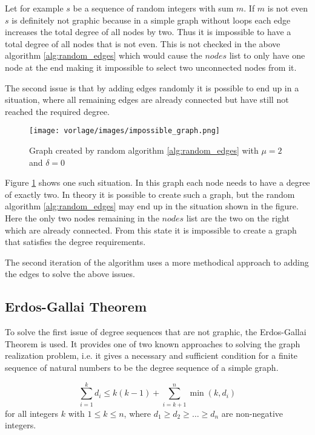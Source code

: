 Let for example $s$ be a sequence of random integers with sum $m$. If $m$ is not even $s$ is definitely not graphic because in a simple graph without loops each edge increases the total degree of all nodes by two. Thus it is impossible to have a total degree of all nodes that is not even. This is not checked in the above algorithm \ref{alg:random_edges} which would cause the $nodes$ list to only have one node at the end making it impossible to select two unconnected nodes from it.
\newline

The second issue is that by adding edges randomly it is possible to end up in a situation, where all remaining edges are already connected but have still not reached the required degree.

\begin{figure}
    \centering
    \texttt{[image: vorlage/images/impossible\_graph.png]}
    \caption{Graph created by random algorithm \ref{alg:random_edges} with $\mu=2$ and $\delta=0$}
    \label{fig:impossible_graph}
\end{figure}

Figure \ref{fig:impossible_graph} shows one such situation. In this graph each node needs to have a degree of exactly two. In theory it is possible to create such a graph, but the random algorithm \ref{alg:random_edges} may end up in the situation shown in the figure. Here the only two nodes remaining in the $nodes$ list are the two on the right which are already connected. From this state it is impossible to create a graph that satisfies the degree requirements.
\newline

The second iteration of the algorithm uses a more methodical approach to adding the edges to solve the above issues.

\subsection{Erdos-Gallai Theorem}
To solve the first issue of degree sequences that are not graphic, the Erdos-Gallai Theorem is used. It provides one of two known approaches to solving the graph realization problem, i.e. it gives a necessary and sufficient condition for a finite sequence of natural numbers to be the degree sequence of a simple graph.

\begin{equation}
\sum_{i=1}^{k} d_i \leq k(k-1) + \sum_{i=k+1}^{n} \min(k, d_i)
\end{equation}
for all integers \(k\) with \(1 \leq k \leq n\), where \(d_1 \geq d_2 \geq \ldots \geq d_n\) are non-negative integers.


